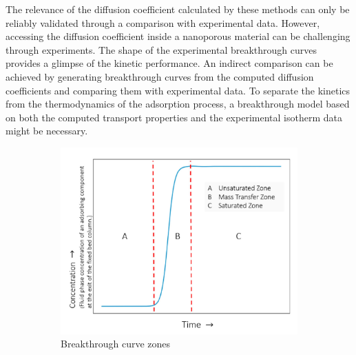 \documentclass[main]{subfiles}
\begin{document}
The relevance of the diffusion coefficient calculated by these methods can only be reliably validated through a comparison with experimental data. However, accessing the diffusion coefficient inside a nanoporous material can be challenging through experiments. The shape of the experimental breakthrough curves provides a glimpse of the kinetic performance. An indirect comparison can be achieved by generating breakthrough curves from the computed diffusion coefficients and comparing them with experimental data. To separate the kinetics from the thermodynamics of the adsorption process, a breakthrough model based on both the computed transport properties and the experimental isotherm data might be necessary.

\begin{figure}[ht]
  \centering
  \begin{subfigure}[b]{0.5\textwidth}
    \centering
    \includegraphics[width=\textwidth]{figures/6-perspectives/breakthrough_cuve_zones.png}
    \caption{Breakthrough curve zones}\label{fgr:breakthrough_zones}
  \end{subfigure}
  \hfill
  \begin{subfigure}[b]{0.4\textwidth}
    \centering

\end{subfigure}
\end{figure}
\end{document}
